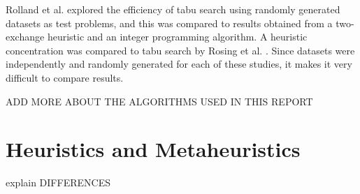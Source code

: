 \documentclass[11pt]{article}
\begin{document}
	Rolland et al. \cite{ROLL97} explored the efficiency of tabu search using randomly generated datasets as test problems, and this was compared to results obtained from a two-exchange heuristic and an integer programming algorithm.  A heuristic concentration was compared to tabu search by Rosing et al. \cite{ROSI98}.  Since datasets were independently and randomly generated for each of these studies, it makes it very difficult to compare results.
	
	ADD MORE ABOUT THE ALGORITHMS USED IN THIS REPORT
	
	\section{Heuristics and Metaheuristics}
		explain DIFFERENCES
	
\end{document}
